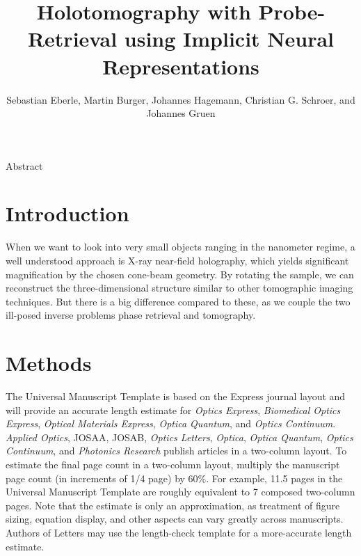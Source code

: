 \documentclass{optica-article}
\begin{document}
\title{Holotomography with Probe-Retrieval using Implicit Neural Representations}

\author{Sebastian Eberle, Martin Burger, Johannes Hagemann, Christian G. Schroer, and Johannes Gruen}

\address{Peer Review, Publications Department, Optica Publishing Group, 2010 Massachusetts Avenue NW, Washington, DC 20036, USA\\
Publications Department, Optica Publishing Group, 2010 Massachusetts Avenue NW, Washington, DC 20036, USA\\
Currently with the Department of Electronic Journals, Optica Publishing Group, 2010 Massachusetts Avenue NW, Washington, DC 20036, USA}



\begin{abstract*} 
Abstract
\end{abstract*}

\section{Introduction}
When we want to look into very small objects ranging in the nanometer regime, a well understood approach is X-ray near-field holography, which yields significant magnification by the chosen cone-beam geometry.
By rotating the sample, we can reconstruct the three-dimensional structure similar to other tomographic imaging techniques.
But there is a big difference compared to these, as we couple the two ill-posed inverse problems phase retrieval and tomography.




\section{Methods}
The Universal Manuscript Template is based on the Express journal layout and will provide an accurate length estimate for \emph{Optics Express}, \emph{Biomedical Optics Express},  \emph{Optical Materials Express}, \emph{Optica Quantum}, and \emph{Optics Continuum}. \emph{Applied Optics}, JOSAA, JOSAB, \emph{Optics Letters}, \emph{Optica}, \emph{Optica Quantum}, \emph{Optics Continuum}, and \emph{Photonics Research} publish articles in a two-column layout. To estimate the final page count in a two-column layout, multiply the manuscript page count (in increments of 1/4 page) by 60\%. For example, 11.5 pages in the Universal Manuscript Template are roughly equivalent to 7 composed two-column pages. Note that the estimate is only an approximation, as treatment of figure sizing, equation display, and other aspects can vary greatly across manuscripts. Authors of Letters may use the length-check template for a more-accurate length estimate.
\end{document}

